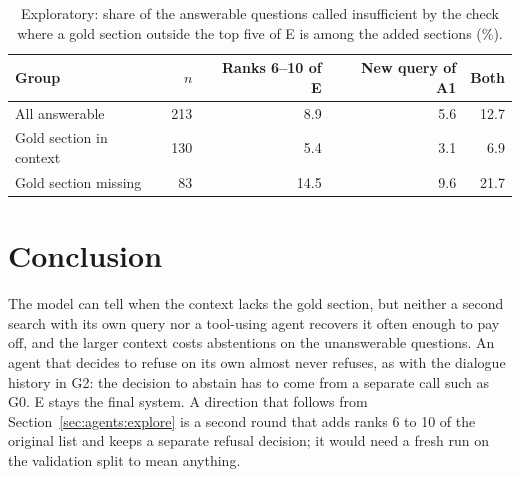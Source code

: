 \begin{table}[ht]
    \centering
    \caption{Exploratory: share of the answerable questions called insufficient by the check where
    a gold section outside the top five of E is among the added sections (\%).}
    \label{tab:agents:explore}
    \small
    \begin{tabular}{lrrrr}
        \toprule
        Group & $n$ & Ranks 6--10 of E & New query of A1 & Both \\
        \midrule
        All answerable          & 213 &  8.9 & 5.6 & 12.7 \\
        Gold section in context & 130 &  5.4 & 3.1 &  6.9 \\
        Gold section missing    &  83 & 14.5 & 9.6 & 21.7 \\
        \bottomrule
    \end{tabular}
\end{table}


\section{Conclusion}\label{sec:agents:conclusion}

The model can tell when the context lacks the gold section, but neither a second search with its
own query nor a tool-using agent recovers it often enough to pay off, and the larger context
costs abstentions on the unanswerable questions. An agent that decides to refuse on its own almost
never refuses, as with the dialogue history in G2: the decision to abstain has to come from a
separate call such as G0. E stays the final system. A direction that follows from
Section~\ref{sec:agents:explore} is a second round that adds ranks 6 to 10 of the original list and
keeps a separate refusal decision; it would need a fresh run on the validation split to mean anything.
